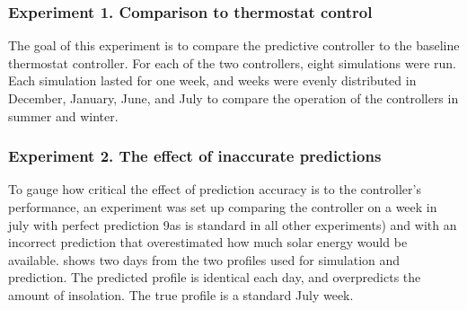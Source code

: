 \subsubsection{Experiment 1. Comparison to thermostat control}

The goal of this experiment is to compare the predictive controller to the baseline thermostat controller.
For each of the two controllers, eight simulations were run.
Each simulation lasted for one week, and weeks were evenly distributed in December, January, June, and July to compare the operation of the controllers in summer and winter.

\subsubsection{Experiment 2. The effect of inaccurate predictions}

To gauge how critical the effect of prediction accuracy is to the controller's performance, an experiment was set up comparing the controller on a week in july with perfect prediction 9as is standard in all other experiments) and with an incorrect prediction that overestimated how much solar energy would be available.
 shows two days from the two profiles used for simulation and prediction.
The predicted profile is identical each day, and overpredicts the amount of insolation.
The true profile is a standard July week.

